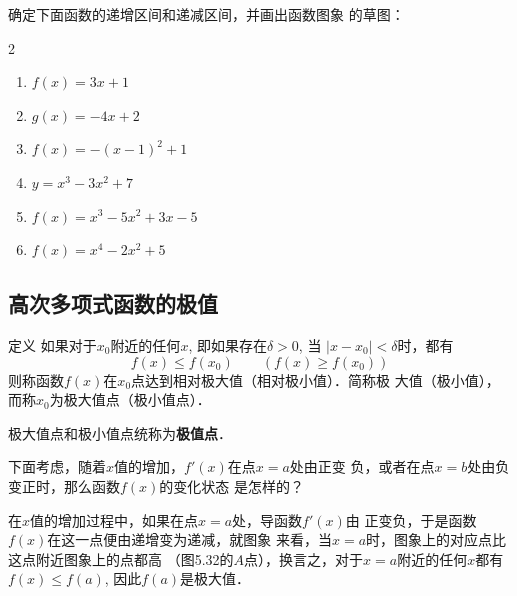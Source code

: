 \begin{ex}
    确定下面函数的递增区间和递减区间，并画出函数图象
    的草图：
\begin{multicols}{2}
\begin{enumerate}
    \item $f(x)=3x+1$
    \item $g(x)=-4x+2$
    \item $f(x)=-(x-1)^2+1$
    \item $y=x^3-3x^2+7$
    \item $f(x)=x^3-5x^2+3x-5$
    \item $f(x)=x^4-2x^2+5$
\end{enumerate}
\end{multicols}
\end{ex}

\subsection{高次多项式函数的极值}

\begin{blk}{定义}
   如果对于$x_0$附近的任何$x$, 即如果存在$\delta>0$, 当
$|x-x_0|<\delta$时，都有
\[f(x)\le f(x_0)\qquad (f(x)\ge f(x_0))\]
则称函数$f(x)$在$x_0$点达到相对极大值（相对极小值）．简称极
大值（极小值），而称$x_0$为极大值点（极小值点）．

极大值点和极小值点统称为\textbf{极值点}．
\end{blk}

下面考虑，随着$x$值的增加，$f'(x)$在点$x=a$处由正变
负，或者在点$x=b$处由负变正时，那么函数$f(x)$的变化状态
是怎样的？

在$x$值的增加过程中，如果在点$x=a$处，导函数$f'(x)$由
正变负，于是函数$f(x)$在这一点便由递增变为递减，就图象
来看，当$x=a$时，图象上的对应点比这点附近图象上的点都高
（图5.32的$A$点），换言之，对于$x=a$附近的任何$x$都有$f(x)\le 
f(a)$, 因此$f(a)$是极大值．
\begin{figure}[htp]
    \centering

    \caption{}
\end{figure}

